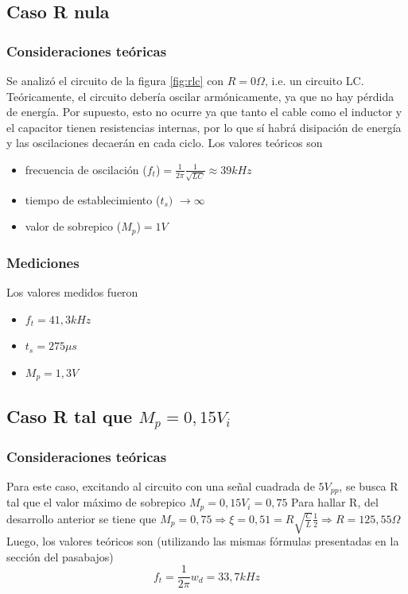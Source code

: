 \subsection{Caso R nula}
\subsubsection{Consideraciones teóricas}
Se analizó el circuito de la figura \ref{fig:rlc} con $R=0\Omega$, i.e. un circuito LC. Teóricamente, el circuito debería oscilar armónicamente, ya que no hay pérdida de energía. Por supuesto, esto no ocurre ya que tanto el cable como el inductor y el capacitor tienen resistencias internas, por lo que sí habrá disipación de energía y las oscilaciones decaerán en cada ciclo.
Los valores teóricos son
\begin{itemize}
  \item frecuencia de oscilación ($f_t$)$=\frac{1}{2\pi}\frac{1}{\sqrt{LC}}\approx 39 kHz$
  \item tiempo de establecimiento ($t_s)$ $\rightarrow \infty$
  \item valor de sobrepico ($M_p$)$=1 V$
\end{itemize}
\subsubsection{Mediciones}

Los valores medidos fueron 
\begin{itemize}
  \item $f_t= 41,3 kHz$
  \item $t_s=275\mu s$
  \item $M_p=1,3 V$
\end{itemize}


\subsection{Caso R tal que $M_p=0,15V_i$}
\subsubsection{Consideraciones teóricas}
Para este caso, excitando al circuito con una señal cuadrada de $5 V_{pp}$, se busca R tal que el valor máximo de sobrepico $M_p=0,15V_i=0,75$
Para hallar R, del desarrollo anterior se tiene que $M_p=0,75\Rightarrow \xi=0,51=R\sqrt{\frac{C}{L}}\frac{1}{2} \Rightarrow R=125,55\Omega $
Luego, los valores teóricos son (utilizando las mismas fórmulas presentadas en la sección del pasabajos) 
\begin{equation}
    f_t=\frac{1}{2\pi}w_d=33,7 kHz
\end{equation}

